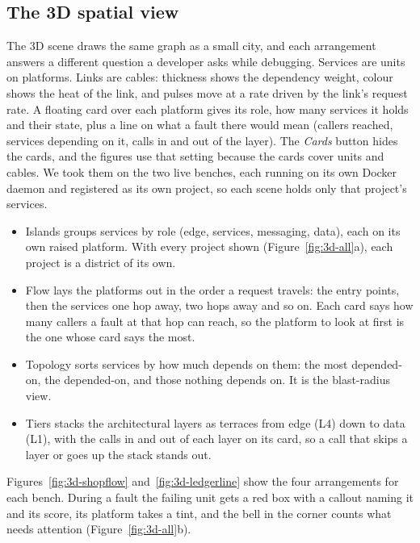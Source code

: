 \subsection{The 3D spatial view}
The 3D scene draws the same graph as a small city, and each arrangement answers a different question a developer asks while debugging. Services are units on platforms. Links are cables: thickness shows the dependency weight, colour shows the heat of the link, and pulses move at a rate driven by the link's request rate. A floating card over each platform gives its role, how many services it holds and their state, plus a line on what a fault there would mean (callers reached, services depending on it, calls in and out of the layer). The \emph{Cards} button hides the cards, and the figures use that setting because the cards cover units and cables. We took them on the two live benches, each running on its own Docker daemon and registered as its own project, so each scene holds only that project's services.
\begin{itemize}
\item Islands groups services by role (edge, services, messaging, data), each on its own raised platform. With every project shown (Figure~\ref{fig:3d-all}a), each project is a district of its own.
\item Flow lays the platforms out in the order a request travels: the entry points, then the services one hop away, two hops away and so on. Each card says how many callers a fault at that hop can reach, so the platform to look at first is the one whose card says the most.
\item Topology sorts services by how much depends on them: the most depended-on, the depended-on, and those nothing depends on. It is the blast-radius view.
\item Tiers stacks the architectural layers as terraces from edge (L4) down to data (L1), with the calls in and out of each layer on its card, so a call that skips a layer or goes up the stack stands out.
\end{itemize}
Figures~\ref{fig:3d-shopflow} and~\ref{fig:3d-ledgerline} show the four arrangements for each bench. During a fault the failing unit gets a red box with a callout naming it and its score, its platform takes a tint, and the bell in the corner counts what needs attention (Figure~\ref{fig:3d-all}b).

